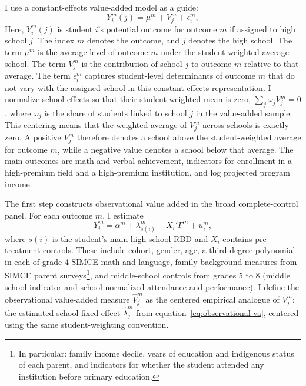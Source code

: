 \documentclass[a4paper, article, english, oneside, unknownkeysallowed, 12pt]{memoir}
\begin{document}
I use a constant-effects value-added model as a guide:
\begin{equation}
  Y_i^m(j) = \mu^m + V_j^m + \epsilon_i^m,
  \label{eq:potential-va}
\end{equation}
Here, $Y_i^m(j)$ is student $i$'s potential outcome for outcome $m$ if assigned to high school $j$.
The index $m$ denotes the outcome, and $j$ denotes the high school.
The term $\mu^m$ is the average level of outcome $m$ under the student-weighted average school.
The term $V_j^m$ is the contribution of school $j$ to outcome $m$ relative to that average.
The term $\epsilon_i^m$ captures student-level determinants of outcome $m$ that do not vary with the assigned school in this constant-effects representation.
I normalize school effects so that their student-weighted mean is zero, $\sum_j \omega_j V_j^m = 0$, where $\omega_j$ is the share of students linked to school $j$ in the value-added sample.
This centering means that the weighted average of $V_j^m$ across schools is exactly zero.
A positive $V_j^m$ therefore denotes a school above the student-weighted average for outcome $m$, while a negative value denotes a school below that average.
The main outcomes are math and verbal achievement, indicators for enrollment in a high-premium field and a high-premium institution, and log projected program income. 

The first step constructs observational value added in the broad complete-control panel.
For each outcome $m$, I estimate
\begin{equation}
  Y_i^m = \alpha^m + \lambda_{s(i)}^m + X_i'\Gamma^m + u_i^m,
  \label{eq:observational-va}
\end{equation}
where $s(i)$ is the student's main high-school RBD and $X_i$ contains pre-treatment controls.
These include cohort, gender, age, a third-degree polynomial in each of grade-4 SIMCE math and language, family-background measures from SIMCE parent surveys\footnote{In particular: family income decile, years of education and indigenous status of each parent, and indicators for whether the student attended any institution before primary education.}, and middle-school controls from grades 5 to 8 (middle school indicator and school-normalized attendance and performance).
I define the observational value-added measure $\widehat{V}_j^m$ as the centered empirical analogue of $V_j^m$: the estimated school fixed effect $\widehat{\lambda}_j^m$ from equation~\eqref{eq:observational-va}, centered using the same student-weighting convention.
\end{document}

